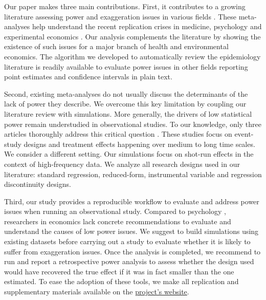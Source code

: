 \documentclass[12pt]{article}
\begin{document}
    Our paper makes three main contributions. First, it contributes to a growing literature assessing power and exaggeration issues in various fields \citep{ioannidis_why_2008, gelman_beyond_2014, ioannidis_power_2017, ferraro_featureis_2020, stommes2021reliability, arel_bundock_quantitative_2022}. These meta-analyses help understand the recent replication crises in medicine, psychology and experimental economics \citep{button_power_2013, open_science_collaboration_estimating_2015, camerer_evaluating_2018}. Our analysis complements the literature by showing the existence of such issues for a major branch of health and environmental economics. The algorithm we developed to automatically review the epidemiology literature is readily available to evaluate power issues in other fields reporting point estimates and confidence intervals in plain text.
    
    Second, existing meta-analyses do not usually discuss the determinants of the lack of power they describe. We overcome this key limitation by coupling our literature review with simulations. More generally, the drivers of low statistical power remain understudied in observational studies. To our knowledge, only three articles thoroughly address this critical question \citep{schell_evaluating_2018, griffin_moving_2021, black_simulated_2022}. These studies focus on event-study designs and treatment effects happening over medium to long time scales. We consider a different setting. Our simulations focus on shot-run effects in the context of high-frequency data. We analyze all research designs used in our literature: standard regression, reduced-form, instrumental variable and regression discontinuity designs.
    
    Third, our study provides a reproducible workflow to evaluate and address power issues when running an observational study. Compared to psychology \citep{altoe_enhancing_2020}, researchers in economics lack concrete recommendations to evaluate and understand the causes of low power issues. We suggest to build simulations using existing datasets before carrying out a study to evaluate whether it is likely to suffer from exaggeration issues. Once the analysis is completed, we recommend to run and report a retrospective power analysis to assess whether the design used would have recovered the true effect if it was in fact smaller than the one estimated. To ease the adoption of these tools, we make all replication and supplementary materials available on the \href{https://vincentbagilet.github.io/inference_pollution/}{project's website}.
\end{document}
